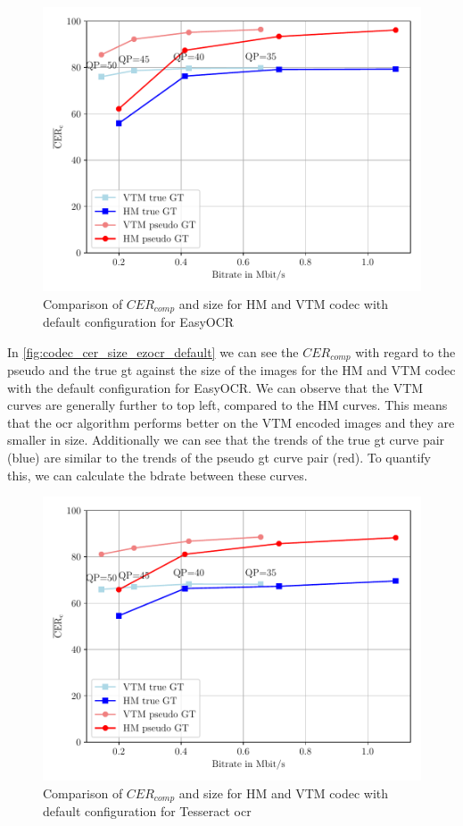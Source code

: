 \begin{figure}[h]
    \centering
    \includegraphics[width=\textwidth]{../images/analyze/codec_cer_size_ezocr_default.pdf}
    \caption{Comparison of $CER_{comp}$ and size for HM and VTM codec with default configuration for EasyOCR}
    \label{fig:codec_cer_size_ezocr_default}
\end{figure}

In \autoref{fig:codec_cer_size_ezocr_default} we can see the $CER_{comp}$ with regard to the pseudo and the true \gls{gt} against the size of the images for the HM and VTM codec with the default configuration for EasyOCR.
We can observe that the VTM curves are generally further to top left, compared to the HM curves.
This means that the \gls{ocr} algorithm performs better on the VTM encoded images and they are smaller in size.
Additionally we can see that the trends of the true \gls{gt} curve pair (blue) are similar to the trends of the pseudo \gls{gt} curve pair (red).
To quantify this, we can calculate the \gls{bdrate} between these curves.

\begin{figure}[h]
    \centering
    \includegraphics[width=\textwidth]{../images/analyze/codec_cer_size_tess_default.pdf}
    \caption{Comparison of $CER_{comp}$ and size for HM and VTM codec with default configuration for Tesseract \gls{ocr}}
    \label{fig:codec_cer_size_tess_default}
\end{figure}

